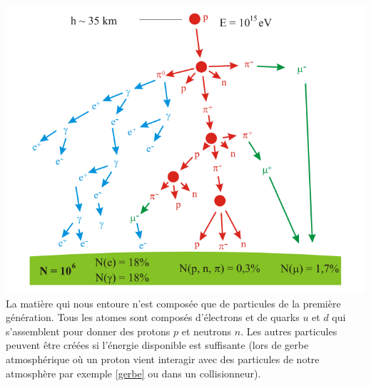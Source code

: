 \marginpar
{
\hspace*{-0.5cm}
\includegraphics[width=1.2\marginparwidth]{SM/shower.png}
\label{gerbe}
}
La matière qui nous entoure n'est composée que de particules de la première génération. Tous les atomes sont composés d'électrons et de quarks $u$ et $d$ qui s'assemblent pour donner des protons $p$ et neutrons $n$. Les autres particules peuvent être créées si l'énergie disponible est suffisante (lors de gerbe atmosphérique où un proton vient interagir avec des particules de notre atmosphère par exemple \ref{gerbe} ou dans un collisionneur).
